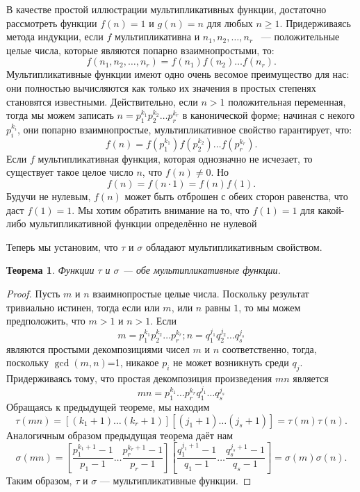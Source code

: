 \documentclass[11pt]{article}
\newtheorem{theorem}{Теорема}
\begin{document}
	В качестве простой иллюстрации мультипликативных функции, достаточно рассмотреть функции $f(n)=1$ и $g(n)=n$ для любых $n\ge1$. Придерживаясь метода индукции, если $f$ мультипликативна и $n_1,n_2,\ldots,n_r$  ~--- положительные целые числа, которые являются попарно взаимнопростыми, то:
	\[
		f(n_1,n_2,\ldots,n_r)=f(n_1)f(n_2)\ldots f(n_r).
	\]
	Мультипликативные функции имеют одно очень весомое преимущество для нас: они полностью вычисляются как только их значения в простых степенях становятся известными. Действительно, если $n>1$ положительная переменная, тогда мы можем записать $n=p_1^{k_1}p_2^{k_2}\ldots p_r^{k_r}$ в канонической форме; начиная с некого $p_i^{k_i}$, они попарно взаимнопростые, мультипликативное свойство гарантирует, что:
	\[
		f(n)=f(p_1^{k_1})f(p_2^{k_2})\ldots f( p_r^{k_r}).
	\]
	Если $f$ мультипликативная функция, которая однозначно не исчезает, то существует такое целое число $n$, что $f(n)\ne0$. Но
	\[
		f(n)=f(n\cdot1)=f(n)f(1).
	\]
	Будучи не нулевым, $f(n)$ может быть отброшен с обеих сторон равенства, что даст $f(1)=1$. Мы хотим обратить внимание на то, что $f(1)=1$ для какой-либо мультипликативной функции определённо не нулевой
	
	Теперь мы установим, что $\tau$ и $\sigma$ обладают мультипликативным свойством.  
	\begin{theorem}
		Функции $\tau$ и $\sigma$ --- обе мультипликативные функции.
	\end{theorem}

	\begin{proof}
		Пусть $m$ и $n$ взаимнопростые целые числа. Поскольку результат тривиально истинен, тогда если или $m$, или $n$ равны $1$, то мы можем предположить, что $m>1$ и $n>1$. Если
		\[
			m=p_1^{k_1}p_2^{k_2}\ldots p_r^{k_r}; n=q_1^{j_1}q_2^{j_2}\ldots q_s^{j_s}
		\]
		являются простыми декомпозициями чисел $m$ и $n$ соответственно, тогда, поскольку $\gcd(m,n)$=1, никакое $p_i$ не может возникнуть среди $q_j$. Придерживаясь тому, что простая декомпозиция произведения $mn$ является 
		\[
			mn=p_1^{k_1}\ldots p_r^{k_r}q_1^{j_1}\ldots q_s^{j_s}
		\]
		Обращаясь к предыдущей теореме, мы находим
		\[
			\tau(mn)=[(k_1+1)\ldots(k_r+1)][(j_1+1)\ldots(j_s+1)]=\tau(m)\tau(n).
		\]
		Аналогичным образом предыдущая теорема даёт нам
		\[
			\sigma(mn)=\left[\frac{p_1^{k_1+1}-1}{p_1-1}\ldots\frac{p_r^{k_r+1}-1}{p_r-1}\right]\left[\frac{q_1^{j_1+1}-1}{q_1-1}\ldots\frac{q_s^{j_s+1}-1}{q_s-1}\right]=\sigma(m)\sigma(n).
		\]
		Таким образом, $\tau$ и $\sigma$ --- мультипликативные функции.
	\end{proof}
		
\end{document}
